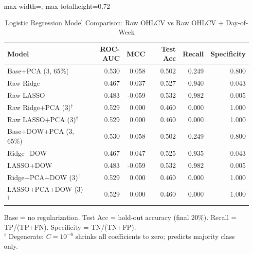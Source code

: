 \begin{table}[htbp]
\centering
\caption{Logistic Regression Model Comparison: Raw OHLCV vs Raw OHLCV + Day-of-Week}
\label{tab:base_logistic_comparison}
\begin{adjustbox}{max width=\linewidth, max totalheight=0.72\textheight}
\begin{tabular}{lrrrrr}
\toprule
Model & ROC-AUC & MCC & Test Acc & Recall & Specificity \\
\midrule
Base+PCA (3, 65\%) & 0.530 & 0.058 & 0.502 & 0.249 & 0.800 \\
Raw Ridge & 0.467 & -0.037 & 0.527 & 0.940 & 0.043 \\
Raw LASSO & 0.483 & -0.059 & 0.532 & 0.982 & 0.005 \\
Raw Ridge+PCA (3)$^\dagger$ & 0.529 & 0.000 & 0.460 & 0.000 & 1.000 \\
Raw LASSO+PCA (3)$^\dagger$ & 0.529 & 0.000 & 0.460 & 0.000 & 1.000 \\
\midrule
Base+DOW+PCA (3, 65\%) & 0.530 & 0.058 & 0.502 & 0.249 & 0.800 \\
Ridge+DOW & 0.467 & -0.047 & 0.525 & 0.935 & 0.043 \\
LASSO+DOW & 0.483 & -0.059 & 0.532 & 0.982 & 0.005 \\
Ridge+PCA+DOW (3)$^\dagger$ & 0.529 & 0.000 & 0.460 & 0.000 & 1.000 \\
LASSO+PCA+DOW (3)$^\dagger$ & 0.529 & 0.000 & 0.460 & 0.000 & 1.000 \\
\bottomrule
\end{tabular}
\end{adjustbox}
\par\smallskip
\scriptsize Base = no regularization. Test Acc = hold-out accuracy (final 20\%). Recall = TP/(TP+FN). Specificity = TN/(TN+FP). \\
\scriptsize $^\dagger$ Degenerate: $C = 10^{-6}$ shrinks all coefficients to zero; predicts majority class only.
\end{table}
